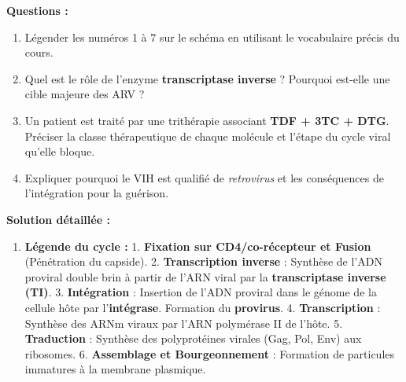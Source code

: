 \documentclass[11pt]{article}
\begin{document}
\begin{exoresolu}
\begin{center}
\end{center}
\textbf{Questions :}
\begin{enumerate}
    \item Légender les numéros 1 à 7 sur le schéma en utilisant le vocabulaire précis du cours.
    \item Quel est le rôle de l'enzyme \textbf{transcriptase inverse} ? Pourquoi est-elle une cible majeure des ARV ?
    \item Un patient est traité par une trithérapie associant \textbf{TDF + 3TC + DTG}. Préciser la classe thérapeutique de chaque molécule et l'étape du cycle viral qu'elle bloque.
    \item Expliquer pourquoi le VIH est qualifié de \emph{retrovirus} et les conséquences de l'intégration pour la guérison.
\end{enumerate}
\tcblower
\textbf{Solution détaillée :}
\begin{enumerate}
    \item \textbf{Légende du cycle :}
    1. \textbf{Fixation sur CD4/co-récepteur et Fusion} (Pénétration du capside).
    2. \textbf{Transcription inverse} : Synthèse de l'ADN proviral double brin à partir de l'ARN viral par la \textbf{transcriptase inverse (TI)}.
    3. \textbf{Intégration} : Insertion de l'ADN proviral dans le génome de la cellule hôte par l'\textbf{intégrase}. Formation du \textbf{provirus}.
    4. \textbf{Transcription} : Synthèse des ARNm viraux par l'ARN polymérase II de l'hôte.
    5. \textbf{Traduction} : Synthèse des polyprotéines virales (Gag, Pol, Env) aux ribosomes.
    6. \textbf{Assemblage et Bourgeonnement} : Formation de particules immatures à la membrane plasmique.

\end{enumerate}
\end{exoresolu}
\end{document}
